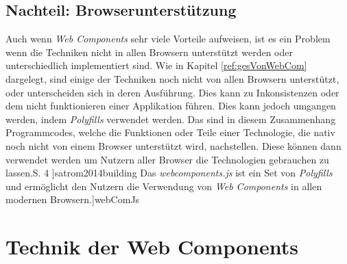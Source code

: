 \documentclass[12pt, paper=a4, bibtotoc, toc=listof, headsepline=true]{scrreprt}
\renewcommand{\smfootcite}[2][2]{\relax}
\begin{document}
			\subsection{Nachteil: Browserunterstützung}
			Auch wenn \emph{Web Components} sehr viele Vorteile aufweisen, ist es ein Problem wenn die Techniken nicht in allen Browsern unterstützt werden oder unterschiedlich implementiert sind. Wie in Kapitel \ref{ref:gesVonWebCom} dargelegt, sind einige der Techniken noch nicht von allen Browsern unterstützt, oder unterscheiden sich in deren Ausführung. Dies kann zu Inkonsistenzen oder dem nicht funktionieren einer Applikation führen. Dies kann jedoch umgangen werden, indem \emph{Polyfills} verwendet werden. Das sind in diesem Zusammenhang Programmcodes, welche die Funktionen oder Teile einer Technologie, die nativ noch nicht von einem Browser unterstützt wird, nachstellen. Diese können dann verwendet werden um Nutzern aller Browser die Technologien gebrauchen zu lassen.\smfootcite[ vgl.][S. 4 ]{satrom2014building} Das \emph{webcomponents.js} ist ein Set von \emph{Polyfills} und ermöglicht den Nutzern die Verwendung von \emph{Web Components} in allen modernen Browsern.\smfootcite[ vgl.][]{webComJs}
			
		\section{Technik der Web Components}
\end{document}
